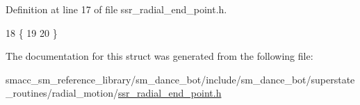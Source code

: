 Definition at line 17 of file ssr\+\_\+radial\+\_\+end\+\_\+point.\+h.


\begin{DoxyCode}
18   \{
19 
20   \}
\end{DoxyCode}


The documentation for this struct was generated from the following file\+:\begin{DoxyCompactItemize}
\item 
smacc\+\_\+sm\+\_\+reference\+\_\+library/sm\+\_\+dance\+\_\+bot/include/sm\+\_\+dance\+\_\+bot/superstate\+\_\+routines/radial\+\_\+motion/\hyperlink{ssr__radial__end__point_8h}{ssr\+\_\+radial\+\_\+end\+\_\+point.\+h}\end{DoxyCompactItemize}
